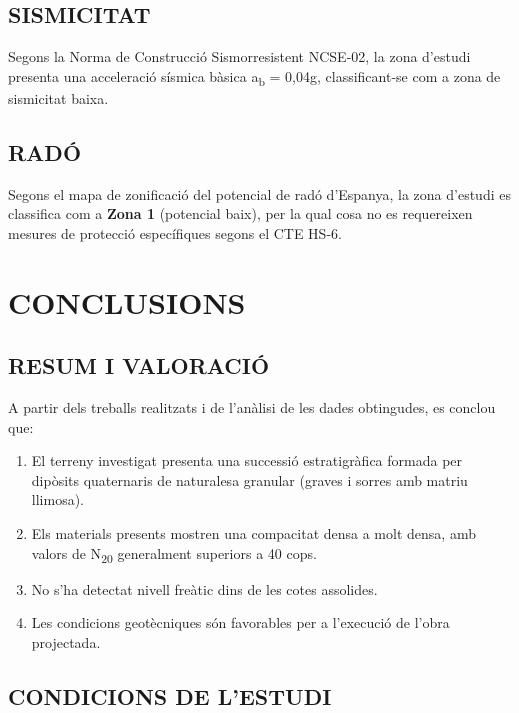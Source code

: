 \documentclass{g3dt-report}
\begin{document}
\subsection{SISMICITAT}

Segons la Norma de Construcció Sismorresistent NCSE-02, la zona d'estudi presenta una acceleració sísmica bàsica a\textsubscript{b} = 0,04g, classificant-se com a zona de sismicitat baixa.

\subsection{RADÓ}

Segons el mapa de zonificació del potencial de radó d'Espanya, la zona d'estudi es classifica com a \textbf{Zona 1} (potencial baix), per la qual cosa no es requereixen mesures de protecció específiques segons el CTE HS-6.


\section{CONCLUSIONS}

\subsection{RESUM I VALORACIÓ}

A partir dels treballs realitzats i de l'anàlisi de les dades obtingudes, es conclou que:

\begin{enumerate}
    \item El terreny investigat presenta una successió estratigràfica formada per dipòsits quaternaris de naturalesa granular (graves i sorres amb matriu llimosa).
    \item Els materials presents mostren una compacitat densa a molt densa, amb valors de N\textsubscript{20} generalment superiors a 40 cops.
    \item No s'ha detectat nivell freàtic dins de les cotes assolides.
    \item Les condicions geotècniques són favorables per a l'execució de l'obra projectada.
\end{enumerate}

\subsection{CONDICIONS DE L'ESTUDI}
\end{document}
